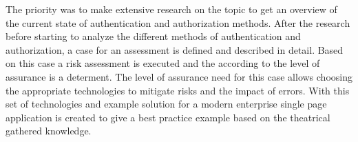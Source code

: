 The priority was to make extensive research on the topic to get an overview of the current state of authentication and authorization methods. After the research before starting to analyze the different methods of authentication and authorization, a case for an assessment is defined and described in detail. Based on this case a risk assessment is executed and the according to the level of assurance is a determent. The level of assurance need for this case allows choosing the appropriate technologies to mitigate risks and the impact of errors. With this set of technologies and example solution for a modern enterprise single page application is created to give a best practice example based on the theatrical gathered knowledge.


\chapterend
